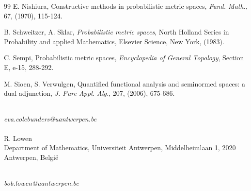 \documentclass[12pt,a4paper]{amsart}
\theoremstyle{theorem}
\theoremstyle{definition}
\begin{document}
{\begin{thebibliography}{99}
 E. Nishiura, Constructive methods in probabilistic metric spaces, \emph{Fund. Math.}, 67, (1970), 115-124.

 B. Schweitzer, A. Sklar, \emph{Probabilistic metric spaces}, North Holland Series in Probability and applied Mathematics, Elsevier Science, New York, (1983).

 C. Sempi, Probabilistic metric spaces, \emph{Encyclopedia of General Topology}, Section E, e-15, 288-292.


 M. Sioen, S. Verwulgen, Quantified functional analysis and seminormed spaces: a dual adjunction, \emph{ J. Pure Appl. Alg.}, 207, (2006), 675-686.



 
  
\end{thebibliography}

\vspace{1cm}

\vspace{1cm}
\\
\emph{eva.colebunders@uantwerpen.be}\\
 \\
R. Lowen \\
Department of Mathematics, Universiteit Antwerpen, Middelheimlaan 1, 2020 Antwerpen, Belgi\"{e}}\\
\emph{bob.lowen@uantwerpen.be}
\end{document}

